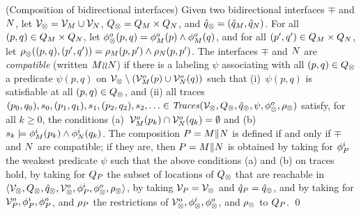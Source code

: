 \begin{defi}{(Composition of bidirectional interfaces)}
\label{def-ag-comp} 
\newline
Given two bidirectional interfaces 
$\mp$ and $N$, let 
${\cal V}_\otimes = {\cal V}_M \cup {\cal V}_N$, 
$Q_\otimes = Q_M \times Q_N$, 
and $\hat{q}_\otimes = (\hat{q}_M,\hat{q}_N)$. 
For all $(p,q) \in Q_M \times Q_N$, 
let $\phi^o_\otimes(p,q) = \phi^o_M(p) \wedge \phi^o_M(q)$,  
and for all $(p',q') \in Q_M \times Q_N$, let 
$\rho_\otimes ((p,q), (p',q')) = \rho_M (p,p') \wedge \rho_N(p,p')$. 
The interfaces $\mp$ and $N$ are {\em compatible\/} 
(written $M {\wr}{\wr} N$) if there is a
labeling $\psi$ associating with all $(p,q) \in Q_\otimes$ 
a predicate $\psi(p,q)$ on 
${\cal V}_\otimes \setminus ({\cal V}^o_M(p) \cup {\cal V}^o_N(q))$ such that 
(i)~$\psi(p,q)$ is satisfiable at all $(p,q) \in Q_\otimes$, and 
(ii) all traces $(p_0,q_0), s_0, (p_1,q_1), s_1, (p_2,q_2), s_2, \ldots \in 
{\text{\textit{Traces}}}({\cal V}_\otimes, Q_\otimes, \hat{q}_\otimes, 
\psi, \phi^o_\otimes,\rho_\otimes)$ 
satisfy, for all $k \geq 0$, the conditions 
(a)~${\cal V}^o_M(p_k) \cap {\cal V}^o_N(q_k) = \emptyset$ and 
(b)~$s_k \models \phi^i_M(p_k) \wedge \phi^i_N(q_k)$. 
The composition $P = M \| N$  is defined if and only if 
$\mp$ and $N$ are compatible; if they are, then $P = M \| N$
is obtained by taking for $\phi^i_P$ the weakest predicate $\psi$ 
such that the above conditions (a) and (b) on traces hold,
by taking for $Q_P$ the subset of locations of $Q_\otimes$ 
that are reachable in 
$\langle {\cal V}_\otimes,Q_\otimes,\hat{q}_\otimes,{\cal V}^o_\otimes,
\phi^i_P,\phi^o_\otimes,\rho_\otimes \rangle$, 
by taking ${\cal V}_P = {\cal V}_\otimes$ 
and $\hat{q}_P = \hat{q}_\otimes$, 
and by taking for ${\cal V}^o_P,\phi^i_P,\phi^o_P$, and $\rho_P$ 
the restrictions of 
${\cal V}^o_\otimes,\phi^i_\otimes,\phi^o_\otimes$, and $\rho_\otimes$ 
to $Q_P$. 
\qed
\end{defi}


